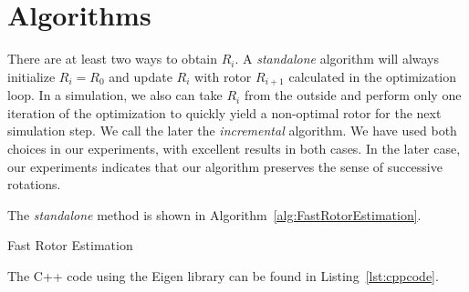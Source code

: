 \documentclass{birkjour}
\numberwithin{equation}{section}
\begin{document}
\section{Algorithms}

There are at least two ways to obtain $R_i$. A \emph{standalone} algorithm will always initialize $R_i = R_0$ and update $R_i$ with rotor $R_{i+1}$ calculated in the optimization loop. In a simulation, we also can take $R_i$ from the outside and perform only one iteration of the optimization to quickly yield a non-optimal rotor for the next simulation step. We call the later the \emph{incremental} algorithm. We have used both choices in our experiments, with excellent results in both cases. In the later case, our experiments indicates that our algorithm preserves the sense of successive rotations.

The \emph{standalone} method is shown in Algorithm~\ref{alg:FastRotorEstimation}. 

\begin{algorithm}
\begin{algorithmic}[1]
\ENDFOR
{} 
\REPEAT
{}
\end{algorithmic}
\caption{Fast Rotor Estimation}\label{alg:FastRotorEstimation}
\end{algorithm}
The C++ code using the Eigen library can be found in Listing~\ref{lst:cppcode}.
\end{document}

